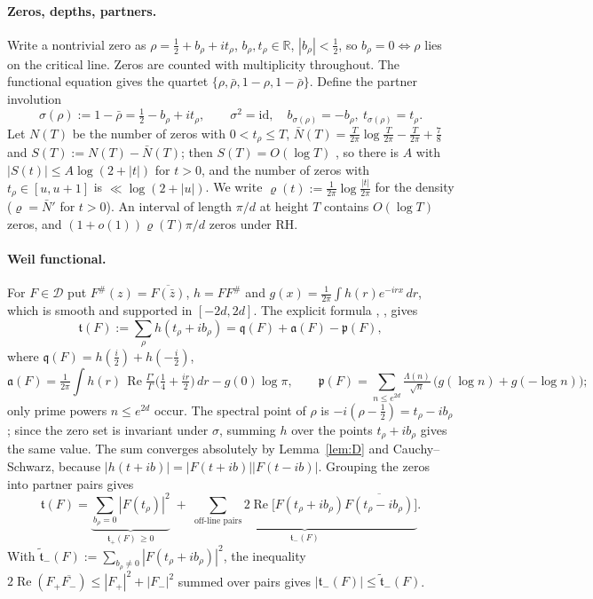 \documentclass[11pt]{amsart}
\theoremstyle{definition}
\theoremstyle{remark}
\newcommand{\re}{\operatorname{Re}}
\newcommand{\half}{\tfrac12}
\newcommand{\tform}{\mathfrak t}
\newcommand{\tplus}{\mathfrak t_+}
\newcommand{\tminus}{\mathfrak t_-}
\newcommand{\ttilde}{\widetilde{\mathfrak t}_-}
\newcommand{\rmar}{\mathfrak a}
\newcommand{\rmq}{\mathfrak q}
\newcommand{\rmp}{\mathfrak p}
\begin{document}
\paragraph{Zeros, depths, partners.} Write a nontrivial zero as
$\rho=\half+b_\rho+it_\rho$, $b_\rho,t_\rho\in\mathbb R$, $|b_\rho|<\half$, so
$b_\rho=0\iff\rho$ lies on the critical line. Zeros are counted with multiplicity
throughout. The functional equation gives the quartet
$\{\rho,\bar\rho,1-\rho,1-\bar\rho\}$. Define the partner involution
\begin{equation}\label{eq:sigma}
\sigma(\rho):=1-\bar\rho=\half-b_\rho+it_\rho,\qquad
\sigma^{2}=\mathrm{id},\quad b_{\sigma(\rho)}=-b_\rho,\ t_{\sigma(\rho)}=t_\rho.
\end{equation}
Let $N(T)$ be the number of zeros with $0<t_\rho\le T$,
$\bar N(T)=\tfrac T{2\pi}\log\tfrac T{2\pi}-\tfrac T{2\pi}+\tfrac78$ and $S(T):=N(T)-\bar
N(T)$; then $S(T)=O(\log T)$ \cite[Thms.~9.3, 9.4]{Titchmarsh}, so there is $A$ with
$|S(t)|\le A\log(2+|t|)$ for $t>0$, and the number of zeros with $t_\rho\in[u,u+1]$ is
$\ll\log(2+|u|)$. We write $\varrho(t):=\tfrac1{2\pi}\log\tfrac{|t|}{2\pi}$ for the
density ($\varrho=\bar N'$ for $t>0$). An interval of length $\pi/d$ at height $T$ contains
$O(\log T)$ zeros, and $(1+o(1))\varrho(T)\pi/d$ zeros under RH.

\paragraph{Weil functional.} For $F\in\mathcal D$ put $F^{\#}(z)=\overline{F(\bar z)}$,
$h=FF^{\#}$ and $g(x)=\tfrac1{2\pi}\int h(r)e^{-irx}\,dr$, which is smooth and supported
in $[-2d,2d]$. The explicit formula \cite{Weil1952}, \cite{Bombieri2000},
\cite[Thm.~5.12]{IwaniecKowalski} gives
\begin{equation}\label{eq:EF}
\tform(F):=\sum_\rho h(t_\rho+ib_\rho)
=\rmq(F)+\rmar(F)-\rmp(F),
\end{equation}
where $\rmq(F)=h(\tfrac i2)+h(-\tfrac i2)$,
\[
\rmar(F)=\tfrac1{2\pi}\int h(r)\,\re\tfrac{\Gamma'}{\Gamma}\big(\tfrac14+\tfrac{ir}2\big)\,dr-g(0)\log\pi,
\qquad
\rmp(F)=\sum_{n\le e^{2d}}\tfrac{\Lambda(n)}{\sqrt n}\,\big(g(\log n)+g(-\log n)\big);
\]
only prime powers $n\le e^{2d}$ occur. The spectral point of $\rho$ is $-i(\rho-\half)=
t_\rho-ib_\rho$; since the zero set is invariant under $\sigma$, summing $h$ over the points
$t_\rho+ib_\rho$ gives the same value. The sum converges absolutely by
Lemma~\ref{lem:D} and Cauchy--Schwarz, because $|h(t+ib)|=|F(t+ib)||F(t-ib)|$. Grouping the
zeros into partner pairs gives
\begin{equation}\label{eq:onoff}
\tform(F)=\underbrace{\sum_{b_\rho=0}|F(t_\rho)|^{2}}_{\tplus(F)\,\ge0}
\;+\;\underbrace{\sum_{\text{off-line pairs}}2\re\!\big[F(t_\rho+ib_\rho)\overline{F(t_\rho-ib_\rho)}\big]}_{\tminus(F)} .
\end{equation}
With $\ttilde(F):=\sum_{b_\rho\ne0}|F(t_\rho+ib_\rho)|^{2}$, the inequality
$2\re(F_+\overline{F_-})\le|F_+|^{2}+|F_-|^{2}$ summed over pairs gives
$|\tminus(F)|\le\ttilde(F)$.
\end{document}
